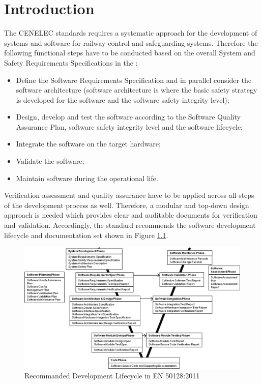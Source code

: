 \documentclass{./template/openetcs2}
\begin{document}
\mainmatter

\chapter{Introduction}

The CENELEC standards requires a systematic approach for the development of systems and software for railway control and safeguarding systems. Therefore the following functional steps have to be conducted based on the overall System and Safety Requirements Specifications in the \citeauthor{EN50128:2011}:

\vspace{-10pt}
\begin{itemize} [topsep=2pt, partopsep=2pt,itemsep=2pt,parsep=2pt]
  \item  Define the Software Requirements Specification and in parallel consider the software architecture (software architecture is where the basic safety strategy is developed for the software and the software safety integrity level); 
  \item Design, develop and test the software according to the Software Quality Assurance Plan, software safety integrity level and the software lifecycle;
  \item Integrate the software on the target hardware;
  \item Validate the software;
  \item Maintain software during the operational life. 
\end{itemize}

Verification assessment and quality assurance have to be applied across all steps of the development process as well. Therefore, a modular and top-down design approach is needed which provides clear and auditable documents for verification and validation. Accordingly, the standard recommends the  software development lifecycle  and documentation set shown in Figure \ref{fig:Development-lifecycle-EN50128}.

\begin{figure}[h]
\centering
\includegraphics[scale=0.6]{Development-lifecycle-EN50128-own.png}
\caption{Recommanded Development Lifecycle in EN 50128:2011}
\label{fig:Development-lifecycle-EN50128}
\end{figure}
\end{document}
